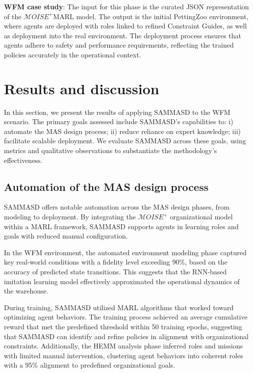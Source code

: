 \documentclass[conference]{IEEEtran}
\begin{document}
\textbf{WFM case study}: The input for this phase is the curated JSON representation of the $\mathcal{M}OISE^+$MARL model. The output is the initial PettingZoo environment, where agents are deployed with roles linked to refined Constraint Guides, as well as deployment into the real environment. The deployment process ensures that agents adhere to safety and performance requirements, reflecting the trained policies accurately in the operational context.

\section{Results and discussion}
\label{sec:results_discussion}

In this section, we present the results of applying SAMMASD to the WFM scenario. The primary goals assessed include SAMMASD's capabilities to: \quad i) automate the MAS design process; \quad ii) reduce reliance on expert knowledge; \quad iii) facilitate scalable deployment. We evaluate SAMMASD across these goals, using metrics and qualitative observations to substantiate the methodology's effectiveness.

\subsection{Automation of the MAS design process}

SAMMASD offers notable automation across the MAS design phases, from modeling to deployment. By integrating the $\mathcal{M}OISE^+$ organizational model within a MARL framework, SAMMASD supports agents in learning roles and goals with reduced manual configuration.

In the WFM environment, the automated environment modeling phase captured key real-world conditions with a fidelity level exceeding 90\%, based on the accuracy of predicted state transitions. This suggests that the RNN-based imitation learning model effectively approximated the operational dynamics of the warehouse.

During training, SAMMASD utilized MARL algorithms that worked toward optimizing agent behaviors. The training process achieved an average cumulative reward that met the predefined threshold within 50 training epochs, suggesting that SAMMASD can identify and refine policies in alignment with organizational constraints. Additionally, the HEMM analysis phase inferred roles and missions with limited manual intervention, clustering agent behaviors into coherent roles with a 95\% alignment to predefined organizational goals.
\end{document}
